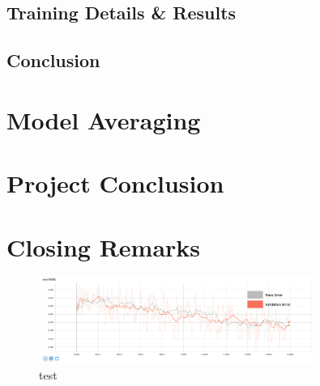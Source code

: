 \documentclass[12pt,a4paper,oneside,oldfontcommands]{memoir}
\begin{document}
\section{Training Details & Results}

\section{Conclusion}

\chapter{Model Averaging}


\chapter{Project Conclusion}

\chapter{Closing Remarks}



\begin{appendices}
\begin{figure}[H]
  \centering
    \includegraphics[width=0.8\textwidth,natwidth=610,natheight=642]{graphs/tycho_1_SGD_0.004_sigmoid.jpg}
    \caption{test}
    \label{fig:tycho_1_SGD_0.04_sigmoid}
\end{figure}

\end{appendices}

\renewcommand{\bibname}{References}


\end{document}
